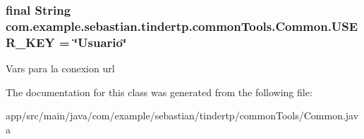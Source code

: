 \subsubsection[{\texorpdfstring{U\+S\+E\+R\+\_\+\+K\+EY}{USER\_KEY}}]{\setlength{\rightskip}{0pt plus 5cm}final String com.\+example.\+sebastian.\+tindertp.\+common\+Tools.\+Common.\+U\+S\+E\+R\+\_\+\+K\+EY = \char`\"{}Usuario\char`\"{}\hspace{0.3cm}{\ttfamily [static]}}\hypertarget{classcom_1_1example_1_1sebastian_1_1tindertp_1_1commonTools_1_1Common_ab1a1f8a9db6e36312ae326c86361829c}{}\label{classcom_1_1example_1_1sebastian_1_1tindertp_1_1commonTools_1_1Common_ab1a1f8a9db6e36312ae326c86361829c}
Vars para la conexion url 

The documentation for this class was generated from the following file\+:\begin{DoxyCompactItemize}
\item 
app/src/main/java/com/example/sebastian/tindertp/common\+Tools/Common.\+java\end{DoxyCompactItemize}

